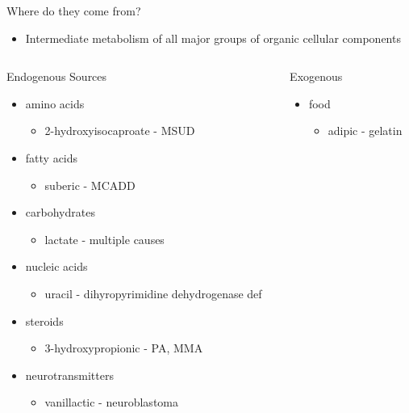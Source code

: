 \documentclass[presentation, smaller]{beamer}
\begin{document}
\begin{frame}[label={sec:org167e6f1}]{Where do they come from?}
\begin{itemize}
\item Intermediate metabolism of all major groups of organic cellular
components
\end{itemize}

\begin{columns}
\begin{column}{0.5\columnwidth}
\begin{block}{Endogenous Sources}
\begin{itemize}
\item amino acids
\begin{itemize}
\item 2-hydroxyisocaproate - MSUD
\end{itemize}
\item fatty acids
\begin{itemize}
\item suberic - MCADD
\end{itemize}
\item carbohydrates
\begin{itemize}
\item lactate - multiple causes
\end{itemize}
\item nucleic acids
\begin{itemize}
\item uracil - dihyropyrimidine dehydrogenase def
\end{itemize}
\item steroids
\begin{itemize}
\item 3-hydroxypropionic - PA, MMA
\end{itemize}
\item neurotransmitters
\begin{itemize}
\item vanillactic - neuroblastoma
\end{itemize}
\end{itemize}
\end{block}
\end{column}
\begin{column}{0.45\columnwidth}
\begin{block}{Exogenous}
\begin{itemize}
\item food
\begin{itemize}
\item adipic - gelatin

\end{itemize}
\end{itemize}
\end{block}
\end{column}
\end{columns}
\end{frame}
\end{document}

